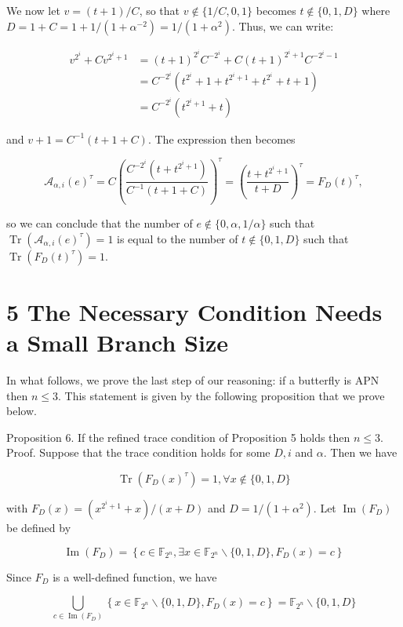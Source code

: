 \documentclass[10pt]{article}
\begin{document}
We now let $v=(t+1) / C$, so that $v \notin\{1 / C, 0,1\}$ becomes $t \notin\{0,1, D\}$ where $D=1+C= 1+1 /\left(1+\alpha^{-2}\right)=1 /\left(1+\alpha^{2}\right)$. Thus, we can write:

$$
\begin{aligned}
v^{2^{i}}+C v^{2^{i}+1} & =(t+1)^{2^{i}} C^{-2^{i}}+C(t+1)^{2^{i}+1} C^{-2^{i}-1} \\
& =C^{-2^{i}}\left(t^{2^{i}}+1+t^{2^{i}+1}+t^{2^{i}}+t+1\right) \\
& =C^{-2^{i}}\left(t^{2^{i}+1}+t\right)
\end{aligned}
$$

and $v+1=C^{-1}(t+1+C)$. The expression then becomes

$$
\mathcal{A}_{\alpha, i}(e)^{\tau}=C\left(\frac{C^{-2^{i}}\left(t+t^{2^{i}+1}\right)}{C^{-1}(t+1+C)}\right)^{\tau}=\left(\frac{t+t^{2^{i}+1}}{t+D}\right)^{\tau}=F_{D}(t)^{\tau},
$$

so we can conclude that the number of $e \notin\{0, \alpha, 1 / \alpha\}$ such that $\operatorname{Tr}\left(\mathcal{A}_{\alpha, i}(e)^{\tau}\right)=1$ is equal to the number of $t \notin\{0,1, D\}$ such that $\operatorname{Tr}\left(F_{D}(t)^{\tau}\right)=1$.

\section*{5 The Necessary Condition Needs a Small Branch Size}
In what follows, we prove the last step of our reasoning: if a butterfly is APN then $n \leq 3$. This statement is given by the following proposition that we prove below.

Proposition 6. If the refined trace condition of Proposition 5 holds then $n \leq 3$.\\
Proof. Suppose that the trace condition holds for some $D, i$ and $\alpha$. Then we have

$$
\operatorname{Tr}\left(F_{D}(x)^{\tau}\right)=1, \forall x \notin\{0,1, D\}
$$

with $F_{D}(x)=\left(x^{2^{i}+1}+x\right) /(x+D)$ and $D=1 /\left(1+\alpha^{2}\right)$. Let $\operatorname{Im}\left(F_{D}\right)$ be defined by

$$
\operatorname{Im}\left(F_{D}\right)=\left\{c \in \mathbb{F}_{2^{n}}, \exists x \in \mathbb{F}_{2^{n}} \backslash\{0,1, D\}, F_{D}(x)=c\right\}
$$

Since $F_{D}$ is a well-defined function, we have

$$
\bigcup_{c \in \operatorname{Im}\left(F_{D}\right)}\left\{x \in \mathbb{F}_{2^{n}} \backslash\{0,1, D\}, F_{D}(x)=c\right\}=\mathbb{F}_{2^{n}} \backslash\{0,1, D\}
$$
\end{document}
